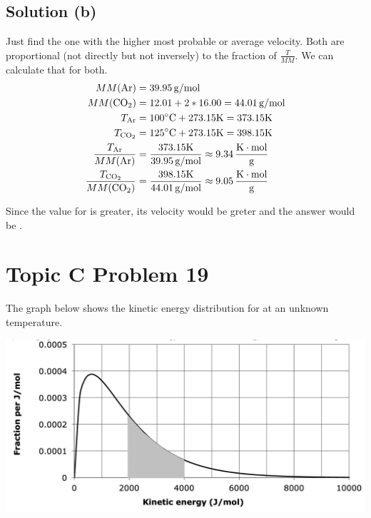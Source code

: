 \documentclass[10pt]{article}
\begin{document}
        \subsection{Solution (b)}
            Just find the one with the higher most probable or average velocity.
            Both are proportional (not directly but not inversely) to the fraction of $\frac{T}{MM}$. 
            We can calculate that for both.
            \begin{align}
                MM(\ce{Ar}) &=  39.95\,\unit{\gram/\mole}\\
                MM(\ce{CO2})&=  12.01 + 2 * 16.00
                    =   44.01\,\unit{\gram/\mole}\\
                T_{\ce{Ar}} &=  100\unit{\celsius} + 273.15\unit{\kelvin}
                    =   373.15\unit{\kelvin}\\
                T_{\ce{CO2}}&=  125\unit{\celsius} + 273.15\unit{\kelvin}
                    =   398.15\unit{\kelvin}\\
                \frac{T_{\ce{Ar}}}{MM(\ce{Ar})} &=  \frac{373.15\unit{\kelvin}}{39.95\,\unit{\gram/\mole}}
                    \approx 9.34\,\unit{\frac{\kelvin\cdot\mole}{\gram}}\\
                \frac{T_{\ce{CO2}}}{MM(\ce{CO2})}   &=  \frac{398.15\unit{\kelvin}}{44.01\,\unit{\gram/\mole}}
                    \approx 9.05\,\unit{\frac{\kelvin\cdot\mole}{\gram}}
            \end{align}

            Since the value for  is greater, its velocity would be greter and the answer would be . 

    \pagebreak
    \section{Topic C Problem 19}
        The graph below shows the kinetic energy distribution for  at an unknown temperature.
        \begin{center}
            \includegraphics[width=\textwidth]{picture_C-19.png}
        \end{center}
        
\end{document}
